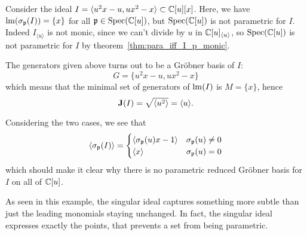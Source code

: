 \begin{example}\upshape
  Consider the ideal $I = \langle u^{2}x - u, ux^{2} - x \rangle \subset \mathbb{C}[u][x]$. Here, we have $\operatorname{lm}(\sigma_{\mathfrak p}(I)) = \{x\}$ for all $\mathfrak p \in \operatorname{Spec}(\mathbb{C}[u])$, but $\operatorname{Spec}(\mathbb{C}[u])$ is not parametric for $I$. Indeed $I_{\langle u \rangle}$ is not monic, since we can't divide by $u$ in $\mathbb{C}[u]_{\langle u \rangle}$, so $\operatorname{Spec}(\mathbb{C}[u])$ is not parametric for $I$ by theorem~\ref{thm:para_iff_I_p_monic}.

  The generators given above turns out to be a Gröbner basis of $I$:
  \[G = \{u^{2}x - u, ux^{2} - x\}\]
  which means that the minimal set of generators of $\operatorname{lm}(I)$ is $M = \{x\}$, hence
  \[\operatorname{\mathbf J}(I) = \sqrt{\langle u^{2} \rangle} = \langle u \rangle.\]

  Considering the two cases, we see that
  \[\langle \sigma_{\mathfrak p}(I) \rangle =
    \begin{cases}
      \langle \sigma_{\mathfrak p}(u)x - 1 \rangle & \sigma_{\mathfrak p}(u) \neq 0 \\
      \langle x \rangle & \sigma_{\mathfrak p}(u) = 0
    \end{cases}
  \]
  which should make it clear why there is no parametric reduced Gröbner basis for $I$ on all of $\mathbb{C}[u]$.
\end{example}

As seen in this example, the singular ideal captures something more subtle than just the leading monomials staying unchanged. In fact, the singular ideal expresses exactly the points, that prevents a set from being parametric.

